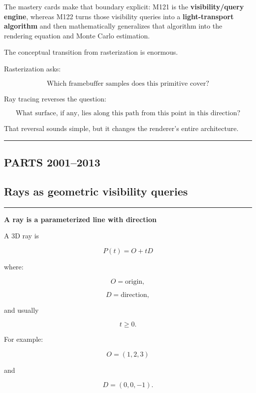 The mastery cards make that boundary explicit: M121 is the \textbf{visibility/query engine}, whereas M122 turns those visibility queries into a \textbf{light-transport algorithm} and then mathematically generalizes that algorithm into the rendering equation and Monte Carlo estimation.

The conceptual transition from rasterization is enormous.

Rasterization asks:

\[
\boxed{
\text{Which framebuffer samples does this primitive cover?}
}
\]

Ray tracing reverses the question:

\[
\boxed{
\text{What surface, if any, lies along this path from this point in this direction?}
}
\]

That reversal sounds simple, but it changes the renderer's entire architecture.

\begin{center}\rule{0.5\linewidth}{0.5pt}\end{center}

\subsection{PARTS 2001--2013}\label{04-visual-computing-ii-ch028-parts-20012013}

\subsection{Rays as geometric visibility queries}\label{04-visual-computing-ii-ch028-rays-as-geometric-visibility-queries}

\begin{center}\rule{0.5\linewidth}{0.5pt}\end{center}

\textbf{A ray is a parameterized line with direction}

A 3D ray is

\[
\boxed{
P(t)=O+tD
}
\]

where:

\[
O=\text{origin},
\]

\[
D=\text{direction},
\]

and usually

\[
t\ge0.
\]

For example:

\[
O=(1,2,3)
\]

and

\[
D=(0,0,-1).
\]

